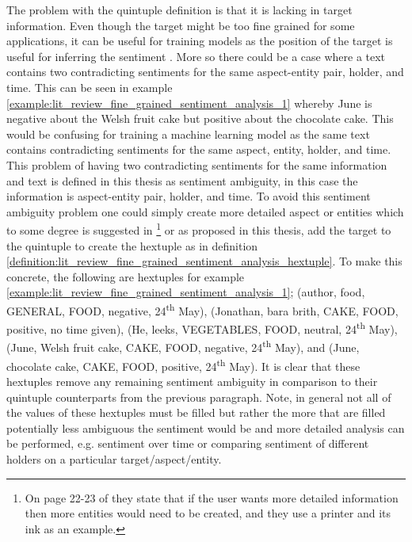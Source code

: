 The problem with the quintuple definition is that it is lacking in target information. Even though the target might be too fine grained for some applications, it can be useful for training models as the position of the target is useful for inferring the sentiment \citep{gu-etal-2018-position}. More so there could be a case where a text contains two contradicting sentiments for the same aspect-entity pair, holder, and time. This can be seen in example \ref{example:lit_review_fine_grained_sentiment_analysis_1} whereby June is negative about the Welsh fruit cake but positive about the chocolate cake. This would be confusing for training a machine learning model as the same text contains contradicting sentiments for the same aspect, entity, holder, and time. This problem of having two contradicting sentiments for the same information and text is defined in this thesis as sentiment ambiguity, in this case the information is aspect-entity pair, holder, and time. To avoid this sentiment ambiguity problem one could simply create more detailed aspect or entities which to some degree is suggested in \citet{liu2015sentiment}\footnote{On page 22-23 of \citet{liu2015sentiment} they state that if the user wants more detailed information then more entities would need to be created, and they use a printer and its ink as an example.} or as proposed in this thesis, add the target to the quintuple to create the hextuple as in definition \ref{definition:lit_review_fine_grained_sentiment_analysis_hextuple}. To make this concrete, the following are hextuples for example \ref{example:lit_review_fine_grained_sentiment_analysis_1}; (author, food, GENERAL, FOOD, negative, 24\textsuperscript{th} May), (Jonathan, bara brith, CAKE, FOOD, positive, no time given), (He, leeks, VEGETABLES, FOOD, neutral, 24\textsuperscript{th} May), (June, Welsh fruit cake, CAKE, FOOD, negative, 24\textsuperscript{th} May), and (June, chocolate cake, CAKE, FOOD, positive, 24\textsuperscript{th} May). It is clear that these hextuples remove any remaining sentiment ambiguity in comparison to their quintuple counterparts from the previous paragraph. Note, in general not all of the values of these hextuples must be filled but rather the more that are filled potentially less ambiguous the sentiment would be and more detailed analysis can be performed, e.g. sentiment over time or comparing sentiment of different holders on a particular target/aspect/entity.

